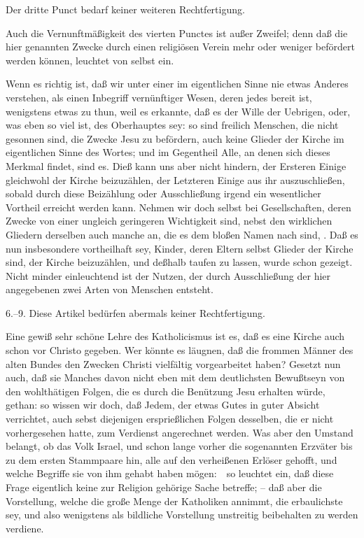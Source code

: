 \begin{aufza}
\item Der dritte Punct bedarf keiner weiteren Rechtfertigung.
\item Auch die Vernunftmäßigkeit des vierten Punctes ist außer Zweifel; denn daß die hier genannten Zwecke durch einen religiösen Verein mehr oder weniger befördert werden können, leuchtet von selbst ein.~
\item Wenn es richtig ist, daß wir unter einer  im eigentlichen Sinne nie etwas Anderes verstehen, als einen Inbegriff vernünftiger Wesen, deren jedes bereit ist, wenigstens etwas zu thun, weil es erkannte, daß es der Wille der Uebrigen, oder, was eben so viel ist, des Oberhauptes sey: so sind freilich Menschen, die nicht gesonnen sind, die Zwecke Jesu zu befördern, auch keine Glieder der Kirche im eigentlichen Sinne des Wortes; und im Gegentheil Alle, an denen sich dieses Merkmal findet, sind es. Dieß kann uns aber nicht hindern, der Ersteren Einige gleichwohl der Kirche beizuzählen, der Letzteren Einige aus ihr auszuschließen, sobald durch diese Beizählung oder Ausschließung irgend ein wesentlicher Vortheil erreicht werden kann. Nehmen wir doch selbst bei Gesellschaften, deren Zwecke von einer ungleich geringeren Wichtigkeit sind, nebst den wirklichen Gliedern derselben auch manche an, die es dem bloßen Namen nach sind, . Daß es nun insbesondere vortheilhaft sey, Kinder, deren Eltern selbst Glieder der Kirche sind, der Kirche beizuzählen, und deßhalb taufen zu lassen, wurde schon gezeigt. Nicht minder einleuchtend ist der Nutzen, der durch Ausschließung der hier angegebenen zwei Arten von Menschen entsteht.
\item[6.--9.]\setcounter{enumi}{9} Diese Artikel bedürfen abermals keiner Rechtfertigung.
\item Eine gewiß sehr schöne Lehre des Katholicismus ist es, daß es eine Kirche auch schon vor Christo gegeben. Wer könnte es läugnen, daß die frommen Männer des alten Bundes den Zwecken Christi vielfältig vorgearbeitet haben? Gesetzt nun auch, daß sie Manches davon nicht eben mit dem deutlichsten Bewußtseyn von den wohlthätigen Folgen, die es durch die Benützung Jesu erhalten würde, gethan: so wissen wir doch, daß Jedem, der etwas Gutes in guter Absicht verrichtet, auch sebst diejenigen ersprießlichen Folgen desselben, die er nicht vorhergesehen hatte, zum Verdienst angerechnet werden. Was aber den Umstand belangt, ob das Volk Israel, und schon lange vorher die sogenannten Erzväter bis zu dem ersten Stammpaare hin, alle auf den verheißenen Erlöser gehofft, und welche Begriffe sie von ihm gehabt haben mögen:~\ so leuchtet ein, daß diese Frage eigentlich keine zur Religion gehörige Sache betreffe; -- daß aber die Vorstellung, welche die große Menge der Katholiken annimmt, die erbaulichste sey, und also wenigstens als bildliche Vorstellung unstreitig beibehalten zu werden verdiene.

\end{aufza}
